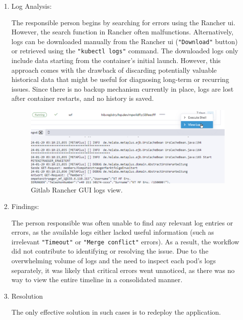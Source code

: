 \documentclass[../main.tex]{subfiles}
\begin{document}
\begin{enumerate}
    \item Log Analysis: 
    
    The responsible person begins by searching for errors using the Rancher \gls{ui}. However, the search function in Rancher often malfunctions. Alternatively, logs can be downloaded manually from the Rancher \gls{ui} (\texttt{"Download"} button) or retrieved using the \texttt{"kubectl logs"} command. The downloaded logs only include data starting from the container’s initial launch. However, this approach comes with the drawback of discarding potentially valuable historical data that might be useful for diagnosing long-term or recurring issues. Since there is no backup mechanism currently in place, logs are lost after container restarts, and no history is saved.

    \begin{figure}[h]
        \centering
        \includegraphics[scale=0.8]{img/2-background/gitlab/rancher_logs_gui.png}
        \caption{Gitlab Rancher GUI logs view.}
        \label{fig:rancher_logs_gui}
    \end{figure}

    \item Findings: 
    
    The person responsible was often unable to find any relevant log entries or errors, as the available logs either lacked useful information (such as irrelevant \texttt{"Timeout"} or \texttt{"Merge conflict"} errors). As a result, the workflow did not contribute to identifying or resolving the issue. Due to the overwhelming volume of logs and the need to inspect each pod’s logs separately, it was likely that critical errors went unnoticed, as there was no way to view the entire timeline in a consolidated manner.

    \item Resolution
    
    The only effective solution in such cases is to redeploy the application.
    
\end{enumerate}
\end{document}
